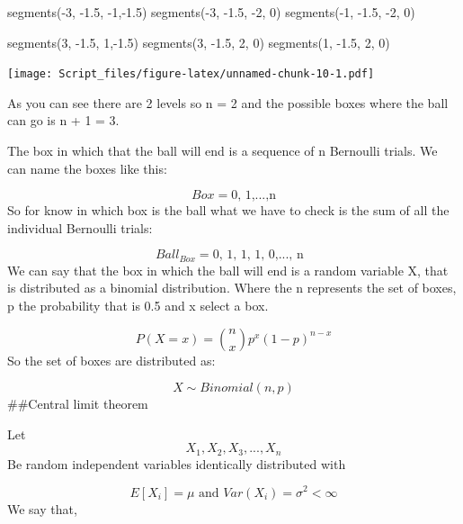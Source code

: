 \documentclass[
]{article}
\newenvironment{Shaded}{\begin{snugshade}}{\end{snugshade}}
\newcommand{\DecValTok}[1]{\textcolor[rgb]{0.00,0.00,0.81}{#1}}
\newcommand{\FloatTok}[1]{\textcolor[rgb]{0.00,0.00,0.81}{#1}}
\newcommand{\FunctionTok}[1]{\textcolor[rgb]{0.00,0.00,0.00}{#1}}
\newcommand{\NormalTok}[1]{#1}
\newcommand{\SpecialCharTok}[1]{\textcolor[rgb]{0.00,0.00,0.00}{#1}}
\begin{document}
\begin{Shaded}
\begin{Highlighting}[]
\FunctionTok{segments}\NormalTok{(}\SpecialCharTok{{-}}\DecValTok{3}\NormalTok{, }\SpecialCharTok{{-}}\FloatTok{1.5}\NormalTok{, }\SpecialCharTok{{-}}\DecValTok{1}\NormalTok{,}\SpecialCharTok{{-}}\FloatTok{1.5}\NormalTok{)}
\FunctionTok{segments}\NormalTok{(}\SpecialCharTok{{-}}\DecValTok{3}\NormalTok{, }\SpecialCharTok{{-}}\FloatTok{1.5}\NormalTok{, }\SpecialCharTok{{-}}\DecValTok{2}\NormalTok{, }\DecValTok{0}\NormalTok{)}
\FunctionTok{segments}\NormalTok{(}\SpecialCharTok{{-}}\DecValTok{1}\NormalTok{, }\SpecialCharTok{{-}}\FloatTok{1.5}\NormalTok{, }\SpecialCharTok{{-}}\DecValTok{2}\NormalTok{, }\DecValTok{0}\NormalTok{)}

\FunctionTok{segments}\NormalTok{(}\DecValTok{3}\NormalTok{, }\SpecialCharTok{{-}}\FloatTok{1.5}\NormalTok{, }\DecValTok{1}\NormalTok{,}\SpecialCharTok{{-}}\FloatTok{1.5}\NormalTok{)}
\FunctionTok{segments}\NormalTok{(}\DecValTok{3}\NormalTok{, }\SpecialCharTok{{-}}\FloatTok{1.5}\NormalTok{, }\DecValTok{2}\NormalTok{, }\DecValTok{0}\NormalTok{)}
\FunctionTok{segments}\NormalTok{(}\DecValTok{1}\NormalTok{, }\SpecialCharTok{{-}}\FloatTok{1.5}\NormalTok{, }\DecValTok{2}\NormalTok{, }\DecValTok{0}\NormalTok{)}
\end{Highlighting}
\end{Shaded}

\texttt{[image: Script\_files/figure-latex/unnamed-chunk-10-1.pdf]}

As you can see there are 2 levels so n = 2 and the possible boxes where
the ball can go is n + 1 = 3.

The box in which that the ball will end is a sequence of n Bernoulli
trials. We can name the boxes like this:

\[ Box = \text{{0, 1,...,n}}\] So for know in which box is the ball what
we have to check is the sum of all the individual Bernoulli trials:

\[Ball_{Box} = \text{{0, 1, 1, 1, 0,..., n} } \] We can say that the box
in which the ball will end is a random variable X, that is distributed
as a binomial distribution. Where the n represents the set of boxes, p
the probability that is 0.5 and x select a box.

\[P(X = x) = \binom{n}{x} p^x(1-p)^{n-x}\] So the set of boxes are
distributed as:

\[X ∼ Binomial(n,p)\] \#\#Central limit theorem

Let \[ X_{1},X_{2},X_{3},...,X_{n} \] Be random independent variables
identically distributed with

\[E[X_{i}] = \mu  \text{    and    }  Var(X_{i}) = \sigma^2 < \infty\]
We say that,
\end{document}
